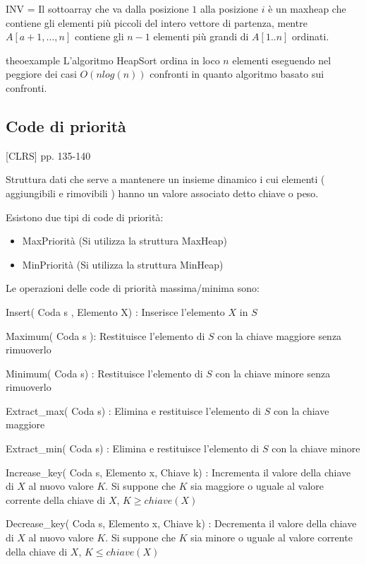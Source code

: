 {INV = Il sottoarray che va dalla posizione $1$ alla posizione $i$ è un maxheap che contiene gli elementi più piccoli del intero vettore di partenza, mentre $A[a+1,\ldots,n]$ contiene gli $n-1$ elementi più grandi di $A[1..n]$ ordinati}{.}

\begin{teorema}{ }{theoexample}
L'algoritmo HeapSort ordina in loco $n$ elementi eseguendo nel peggiore dei casi $O(nlog(n))$ confronti in quanto algoritmo basato sui confronti.
\end{teorema}

\subsection{Code di priorità}

{{[}CLRS{]} pp. 135-140}

{Struttura dati che serve a mantenere un insieme dinamico i cui elementi ( aggiungibili e rimovibili ) hanno un valore associato detto chiave o peso.}

{Esistono due tipi di code di priorità:}

\begin{itemize}
\tightlist
\item
  {MaxPriorità (Si utilizza la struttura MaxHeap)}
\item
  {MinPriorità (Si utilizza la struttura MinHeap)}
\end{itemize}

{Le operazioni delle code di priorità massima/minima sono:}

{Insert( Coda s , Elemento X) : Inserisce l'elemento $X$ in $S$}

{Maximum( Coda s ): Restituisce l'elemento di $S$ con la chiave maggiore senza rimuoverlo}

{Minimum( Coda s) : Restituisce l'elemento di $S$ con la chiave minore senza rimuoverlo}

{Extract\_max( Coda s) : Elimina e restituisce l'elemento di $S$ con la chiave maggiore}

{Extract\_min( Coda s) : Elimina e restituisce l'elemento di $S$ con la chiave minore}

{Increase\_key( Coda s, Elemento x, Chiave k) : Incrementa il valore della chiave di $X$ al nuovo valore $K$. Si suppone che $K$ sia maggiore o uguale al valore corrente della chiave di $X$, $K \geq chiave(X)$}

{Decrease\_key( Coda s, Elemento x, Chiave k) : Decrementa il valore della chiave di $X$ al nuovo valore $K$. Si suppone che $K$ sia minore o uguale al valore corrente della chiave di $X$, $K \leq chiave(X)$}

